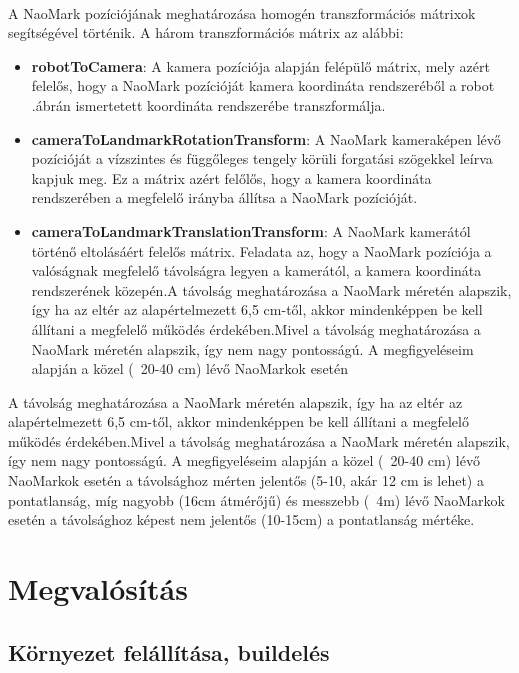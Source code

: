 \documentclass{article}
\numberwithin{figure}{section}
\newcommand{\figref}[1]{\aref{fig:#1}.ábr}
\newenvironment{compactlist}
{ \begin{itemize}
    \setlength{\itemsep}{0pt}
    \setlength{\parskip}{0pt}
    \setlength{\parsep}{0pt}
	\setlength{\topsep}{0pt}
}
{ \end{itemize}}
\begin{document}
\begin{sloppypar}
		\paragraph{}
		A NaoMark pozíciójának meghatározása homogén transzformációs mátrixok segítségével történik. A három transzformációs mátrix az alábbi:
		\begin{compactlist}
			\item \textbf{robotToCamera}: A kamera pozíciója alapján felépülő mátrix, mely azért felelős, hogy a NaoMark pozícióját kamera koordináta rendszeréből a robot \figref{coords}án ismertetett koordináta rendszerébe transzformálja.
			\item \textbf{cameraToLandmarkRotationTransform}: A NaoMark kameraképen lévő pozícióját a vízszintes és függőleges tengely körüli forgatási szögekkel leírva kapjuk meg. Ez a mátrix azért felőlős, hogy a kamera koordináta rendszerében a megfelelő irányba állítsa a NaoMark pozícióját.
			\item \textbf{cameraToLandmarkTranslationTransform}: A NaoMark kamerától történő eltolásáért felelős mátrix. Feladata az, hogy a NaoMark pozíciója a valóságnak megfelelő távolságra legyen a kamerától, a kamera koordináta rendszerének közepén.A távolság meghatározása a NaoMark méretén alapszik, így ha az eltér az alapértelmezett 6,5 cm-től, akkor mindenképpen be kell állítani a megfelelő működés érdekében.Mivel a távolság meghatározása a NaoMark méretén alapszik, így nem nagy pontosságú. A megfigyeléseim alapján a közel (~20-40 cm) lévő NaoMarkok esetén 
		\end{compactlist}
		A távolság meghatározása a NaoMark méretén alapszik, így ha az eltér az alapértelmezett 6,5 cm-től, akkor mindenképpen be kell állítani a megfelelő működés érdekében.Mivel a távolság meghatározása a NaoMark méretén alapszik, így nem nagy pontosságú. A megfigyeléseim alapján a közel (~20-40 cm) lévő NaoMarkok esetén a távolsághoz mérten jelentős (5-10, akár 12 cm is lehet) a pontatlanság, míg nagyobb (16cm átmérőjű) és messzebb (~4m) lévő NaoMarkok esetén a távolsághoz képest nem jelentős (10-15cm) a pontatlanság mértéke.
		\section{Megvalósítás}
		\subsection{Környezet felállítása, buildelés}

\end{sloppypar}
\end{document}
